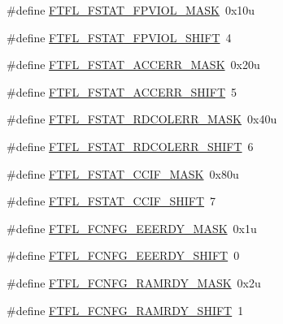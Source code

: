 \begin{DoxyCompactItemize}
\item 
\#define \hyperlink{group___f_t_f_l___register___masks_ga01be669b3badf964a2db479cc61155b1}{F\+T\+F\+L\+\_\+\+F\+S\+T\+A\+T\+\_\+\+F\+P\+V\+I\+O\+L\+\_\+\+M\+A\+SK}~0x10u
\item 
\#define \hyperlink{group___f_t_f_l___register___masks_ga45d86da8dc4233e6882aad64743b3449}{F\+T\+F\+L\+\_\+\+F\+S\+T\+A\+T\+\_\+\+F\+P\+V\+I\+O\+L\+\_\+\+S\+H\+I\+FT}~4
\item 
\#define \hyperlink{group___f_t_f_l___register___masks_ga5ce6aed459fb58e0c75f6b46a34dc3e3}{F\+T\+F\+L\+\_\+\+F\+S\+T\+A\+T\+\_\+\+A\+C\+C\+E\+R\+R\+\_\+\+M\+A\+SK}~0x20u
\item 
\#define \hyperlink{group___f_t_f_l___register___masks_ga96524c0503f7920b242fd345e33246d6}{F\+T\+F\+L\+\_\+\+F\+S\+T\+A\+T\+\_\+\+A\+C\+C\+E\+R\+R\+\_\+\+S\+H\+I\+FT}~5
\item 
\#define \hyperlink{group___f_t_f_l___register___masks_ga8aa3ae8a1526551f7f85657da0524ba2}{F\+T\+F\+L\+\_\+\+F\+S\+T\+A\+T\+\_\+\+R\+D\+C\+O\+L\+E\+R\+R\+\_\+\+M\+A\+SK}~0x40u
\item 
\#define \hyperlink{group___f_t_f_l___register___masks_ga5e3cd3ca714a0f565cd8faf77c8dbc93}{F\+T\+F\+L\+\_\+\+F\+S\+T\+A\+T\+\_\+\+R\+D\+C\+O\+L\+E\+R\+R\+\_\+\+S\+H\+I\+FT}~6
\item 
\#define \hyperlink{group___f_t_f_l___register___masks_gad156c3b7ab8792f982703b7353612b01}{F\+T\+F\+L\+\_\+\+F\+S\+T\+A\+T\+\_\+\+C\+C\+I\+F\+\_\+\+M\+A\+SK}~0x80u
\item 
\#define \hyperlink{group___f_t_f_l___register___masks_ga62035ccf898d9dd64ce71697fb22491e}{F\+T\+F\+L\+\_\+\+F\+S\+T\+A\+T\+\_\+\+C\+C\+I\+F\+\_\+\+S\+H\+I\+FT}~7
\item 
\#define \hyperlink{group___f_t_f_l___register___masks_ga223da0ec4b235360803f3c99975720fb}{F\+T\+F\+L\+\_\+\+F\+C\+N\+F\+G\+\_\+\+E\+E\+E\+R\+D\+Y\+\_\+\+M\+A\+SK}~0x1u
\item 
\#define \hyperlink{group___f_t_f_l___register___masks_ga1a9c07d1eafc3125cb3f2bded6515ed2}{F\+T\+F\+L\+\_\+\+F\+C\+N\+F\+G\+\_\+\+E\+E\+E\+R\+D\+Y\+\_\+\+S\+H\+I\+FT}~0
\item 
\#define \hyperlink{group___f_t_f_l___register___masks_gaa079c0487aa35c8a06dbebddc2c960ef}{F\+T\+F\+L\+\_\+\+F\+C\+N\+F\+G\+\_\+\+R\+A\+M\+R\+D\+Y\+\_\+\+M\+A\+SK}~0x2u
\item 
\#define \hyperlink{group___f_t_f_l___register___masks_ga4e6f3844069dcbb1a0a572a5e2e8572f}{F\+T\+F\+L\+\_\+\+F\+C\+N\+F\+G\+\_\+\+R\+A\+M\+R\+D\+Y\+\_\+\+S\+H\+I\+FT}~1
\item 

\end{DoxyCompactItemize}
